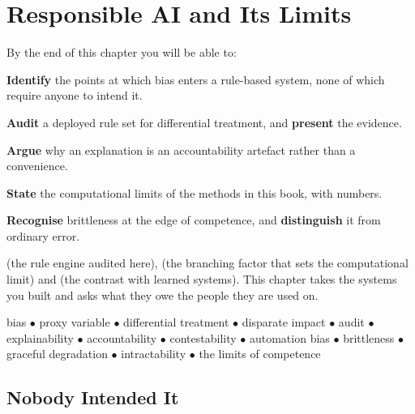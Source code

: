 \chapter{Responsible AI and Its Limits}\label{ch:responsible}

\begin{outcomes}
By the end of this chapter you will be able to:
\begin{tight}
  \item \textbf{Identify} the points at which bias enters a rule-based system,
        none of which require anyone to intend it.
  \item \textbf{Audit} a deployed rule set for differential treatment, and
        \textbf{present} the evidence.
  \item \textbf{Argue} why an explanation is an accountability artefact rather than
        a convenience.
  \item \textbf{State} the computational limits of the methods in this book, with
        numbers.
  \item \textbf{Recognise} brittleness at the edge of competence, and
        \textbf{distinguish} it from ordinary error.
\end{tight}
\end{outcomes}

\begin{prereq}
 (the rule engine audited here),  (the branching
factor that sets the computational limit) and  (the contrast with
learned systems). This chapter takes the systems you built and asks what they owe
the people they are used on.
\end{prereq}

\begin{keyterms}
bias $\bullet$ proxy variable $\bullet$ differential treatment $\bullet$ disparate
impact $\bullet$ audit $\bullet$ explainability $\bullet$ accountability $\bullet$
contestability $\bullet$ automation bias $\bullet$ brittleness $\bullet$ graceful
degradation $\bullet$ intractability $\bullet$ the limits of competence
\end{keyterms}

\section{Nobody Intended It}

